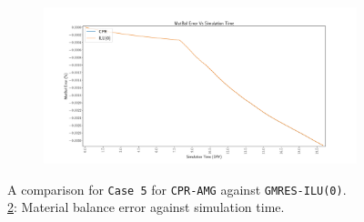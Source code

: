 \begin{figure}
\centering
\begin{subfigure}[b]{\textwidth}
   \includegraphics[width=1\linewidth]{figures/viscous/80x80/matbalerr_time.pdf}
   \caption{}
   \label{viscous80_matbalerr}
\end{subfigure}

\caption[caption]{A comparison for \texttt{Case 5} for \texttt{CPR-AMG} against \texttt{GMRES-ILU(0)}.\\\hspace{\textwidth}
	\cref{viscous80_matbalerr}: Material balance error against simulation time. \\\hspace{\textwidth}}
\end{figure}

